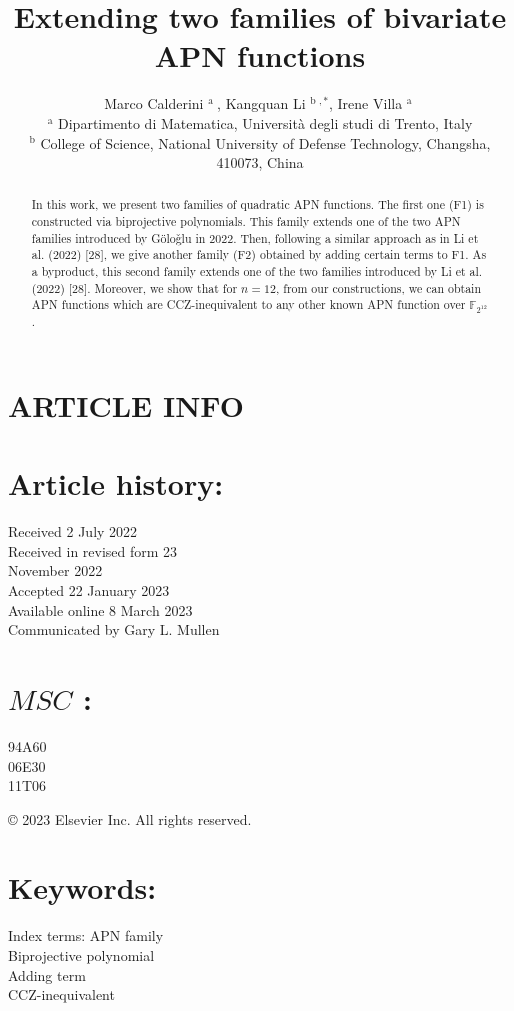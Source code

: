 \documentclass[10pt]{article}
\title{Extending two families of bivariate APN functions }
\author{Marco Calderini ${ }^{\text {a }}$, Kangquan Li ${ }^{\text {b }, *}$, Irene Villa ${ }^{\text {a }}$\\
${ }^{\mathrm{a}}$ Dipartimento di Matematica, Università degli studi di Trento, Italy\\
${ }^{\mathrm{b}}$ College of Science, National University of Defense Technology, Changsha, 410073, China}
\date{}
\begin{document}
\maketitle
\captionsetup{singlelinecheck=false}


\section*{ARTICLE INFO}
\section*{Article history:}
Received 2 July 2022\\
Received in revised form 23\\
November 2022\\
Accepted 22 January 2023\\
Available online 8 March 2023\\
Communicated by Gary L. Mullen

\section*{$M S C$ :}
94A60\\
06E30\\
11T06

\begin{abstract}
In this work, we present two families of quadratic APN functions. The first one (F1) is constructed via biprojective polynomials. This family extends one of the two APN families introduced by Göloǧlu in 2022. Then, following a similar approach as in Li et al. (2022) [28], we give another family (F2) obtained by adding certain terms to F1. As a byproduct, this second family extends one of the two families introduced by Li et al. (2022) [28]. Moreover, we show that for $n=12$, from our constructions, we can obtain APN functions which are CCZ-inequivalent to any other known APN function over $\mathbb{F}_{2^{12}}$.
\end{abstract}

© 2023 Elsevier Inc. All rights reserved.

\section*{Keywords:}
Index terms: APN family\\
Biprojective polynomial\\
Adding term\\
CCZ-inequivalent
\end{document}

